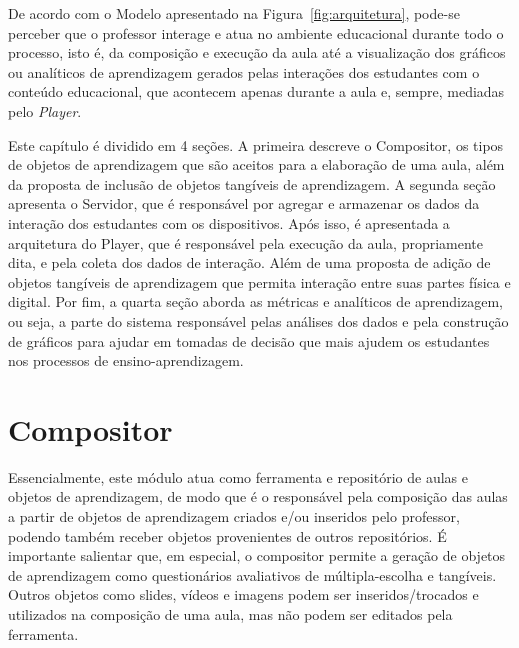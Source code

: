 De acordo com o Modelo apresentado na Figura~\ref{fig:arquitetura}, pode-se perceber que o professor interage e atua no ambiente educacional durante todo o processo, isto é, da composição e execução da aula até a visualização dos gráficos ou analíticos de aprendizagem gerados pelas interações dos estudantes com o conteúdo educacional, que acontecem apenas durante a aula e, sempre, mediadas pelo \textit{Player}.

Este capítulo é dividido em 4 seções. A primeira descreve o Compositor, os tipos de objetos de aprendizagem que são aceitos para a elaboração de uma aula, além da proposta de inclusão de objetos tangíveis de aprendizagem. A segunda seção apresenta o Servidor, que é responsável por agregar e armazenar os dados da interação dos estudantes com os dispositivos. Após isso, é apresentada a arquitetura do Player, que é responsável pela execução da aula, propriamente dita, e pela coleta dos dados de interação. Além de uma proposta de adição de objetos tangíveis de aprendizagem que permita interação entre suas partes física e digital. Por fim, a quarta seção aborda as métricas e analíticos de aprendizagem, ou seja, a parte do sistema responsável pelas análises dos dados e pela construção de gráficos para ajudar em tomadas de decisão que mais ajudem os estudantes nos processos de ensino-aprendizagem. %


\section{Compositor}\label{section:composer}
Essencialmente, este módulo atua como ferramenta e repositório de aulas e objetos de aprendizagem, de modo que é o responsável pela composição das aulas a partir de objetos de aprendizagem criados e/ou inseridos pelo professor, podendo também receber objetos provenientes de outros repositórios. É importante salientar que, em especial, o compositor permite a geração de objetos de aprendizagem como questionários avaliativos de múltipla-escolha e tangíveis. Outros objetos como slides, vídeos e imagens podem ser inseridos/trocados e utilizados na composição de uma aula, mas não podem ser editados pela ferramenta.

